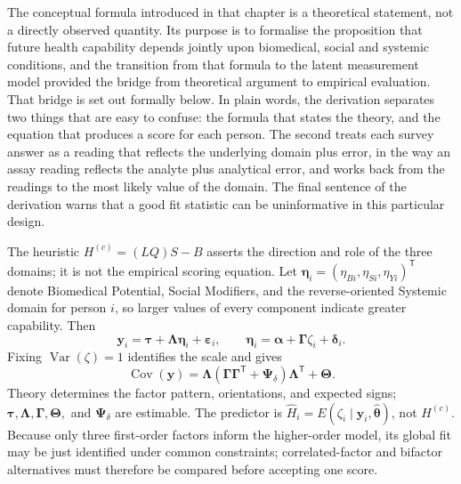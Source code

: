 The conceptual formula introduced in that chapter is a theoretical statement, not a directly observed quantity. Its purpose is to formalise the proposition that future health capability depends jointly upon biomedical, social and systemic conditions, and the transition from that formula to the latent measurement model provided the bridge from theoretical argument to empirical evaluation. That bridge is set out formally below. In plain words, the derivation separates two things that are easy to confuse: the formula that states the theory, and the equation that produces a score for each person. The second treats each survey answer as a reading that reflects the underlying domain plus error, in the way an assay reading reflects the analyte plus analytical error, and works back from the readings to the most likely value of the domain. The final sentence of the derivation warns that a good fit statistic can be uninformative in this particular design.

\begin{derivation}
\label{der:bridge}
The heuristic $H^{(c)}=(LQ)S-B$ asserts the direction and role of the three
domains; it is not the empirical scoring equation. Let
$\boldsymbol\eta_i=(\eta_{Bi},\eta_{Si},\eta_{Yi})^{\mathsf T}$ denote Biomedical
Potential, Social Modifiers, and the reverse-oriented Systemic domain for person
$i$, so larger values of every component indicate greater capability. Then
\[
 \mathbf y_i=\boldsymbol\tau+\boldsymbol\Lambda\boldsymbol\eta_i+
 \boldsymbol\varepsilon_i,
 \qquad
 \boldsymbol\eta_i=\boldsymbol\alpha+\boldsymbol\Gamma\zeta_i+
 \boldsymbol\delta_i .
\]
Fixing $\operatorname{Var}(\zeta)=1$ identifies the scale and gives
\[
 \operatorname{Cov}(\mathbf y)=\boldsymbol\Lambda
 (\boldsymbol\Gamma\boldsymbol\Gamma^{\mathsf T}+\boldsymbol\Psi_\delta)
 \boldsymbol\Lambda^{\mathsf T}+\boldsymbol\Theta.
\]
Theory determines the factor pattern, orientations, and expected signs;
$\boldsymbol\tau,\boldsymbol\Lambda,\boldsymbol\Gamma,
\boldsymbol\Theta,$ and $\boldsymbol\Psi_\delta$ are estimable. The predictor is
$\widehat H_i=E(\zeta_i\mid\mathbf y_i,\widehat{\boldsymbol\theta})$, not
$H^{(c)}$. Because only three first-order factors inform the higher-order model,
its global fit may be just identified under common constraints; correlated-factor
and bifactor \citep{reise_2012} alternatives must therefore be compared before accepting one score.
\end{derivation}

